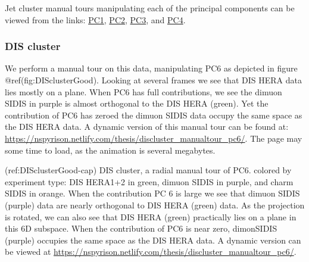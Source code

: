 Jet cluster manual tours manipulating each of the principal components can be viewed from the links: \href{https://nspyrison.netlify.com/thesis/jetcluster_manualtour_pc1/}{PC1}, \href{https://nspyrison.netlify.com/thesis/jetcluster_manualtour_pc2/}{PC2}, \href{https://nspyrison.netlify.com/thesis/jetcluster_manualtour_pc3/}{PC3}, and \href{https://nspyrison.netlify.com/thesis/jetcluster_manualtour_pc4/}{PC4}.

\hypertarget{dis-cluster}{%
\subsubsection{DIS cluster}\label{dis-cluster}}

We perform a manual tour on this data, manipulating PC6 as depicted in figure @ref(fig:DISclusterGood). Looking at several frames we see that DIS HERA data lies mostly on a plane. When PC6 has full contributions, we see the dimuon SIDIS in purple is almost orthogonal to the DIS HERA (green). Yet the contribution of PC6 has zeroed the dimuon SIDIS data occupy the same space as the DIS HERA data. A dynamic version of this manual tour can be found at:
\url{https://nspyrison.netlify.com/thesis/discluster_manualtour_pc6/}.
The page may some time to load, as the animation is several megabytes.

(ref:DISclusterGood-cap) DIS cluster, a radial manual tour of PC6. colored by experiment type: DIS HERA1+2 in green, dimuon SIDIS in purple, and charm SIDIS in orange. When the contribution PC 6 is large we see that dimuon SIDIS (purple) data are nearly orthogonal to DIS HERA (green) data. As the projection is rotated, we can also see that DIS HERA (green) practically lies on a plane in this 6D subspace. When the contribution of PC6 is near zero, dimonSIDIS (purple) occupies the same space as the DIS HERA data. A dynamic version can be viewed at \url{https://nspyrison.netlify.com/thesis/discluster_manualtour_pc6/}.

